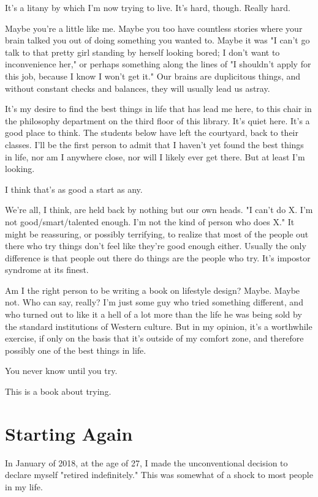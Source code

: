 \documentclass[]{book}
\begin{document}
It's a litany by which I'm now trying to live. It's hard, though. Really hard.

Maybe you're a little like me. Maybe you too have countless stories where your
brain talked you out of doing something you wanted to. Maybe it was "I can't go
talk to that pretty girl standing by herself looking bored; I don't want to
inconvenience her," or perhaps something along the lines of "I shouldn't apply
for this job, because I know I won't get it." Our brains are duplicitous things,
and without constant checks and balances, they will usually lead us astray.

It's my desire to find the best things in life that has lead me here, to this
chair in the philosophy department on the third floor of this library. It's
quiet here. It's a good place to think. The students below have left the
courtyard, back to their classes. I'll be the first person to admit that I
haven't yet found the best things in life, nor am I anywhere close, nor will I
likely ever get there. But at least I'm looking.

I think that's as good a start as any.

We're all, I think, are held back by nothing but our own heads. "I can't do X.
I'm not good/smart/talented enough. I'm not the kind of person who does X." It
might be reassuring, or possibly terrifying, to realize that most of the people
out there who try things don't feel like they're good enough either. Usually
the only difference is that people out there do things are the people who try.
It's impostor syndrome at its finest.

Am I the right person to be writing a book on lifestyle design? Maybe. Maybe
not. Who can say, really? I'm just some guy who tried something different, and
who turned out to like it a hell of a lot more than the life he was being sold
by the standard institutions of Western culture. But in my opinion, it's a
worthwhile exercise, if only on the basis that it's outside of my comfort zone,
and therefore possibly one of the best things in life.

You never know until you try.

This is a book about trying.


\chapter{Starting Again}

In January of 2018, at the age of 27, I made the unconventional decision to
declare myself "retired indefinitely." This was somewhat of a shock to most
people in my life.
\end{document}
